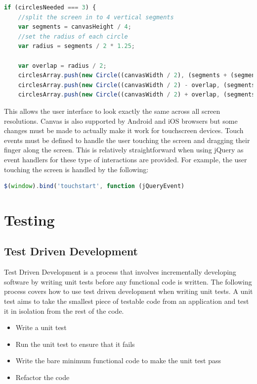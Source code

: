 \documentclass[12pt,a4paper]{report}
\begin{document}
\begin{lstlisting}[language=JavaScript]
if (circlesNeeded === 3) {
    //split the screen in to 4 vertical segments
    var segments = canvasHeight / 4;
    //set the radius of each circle
    var radius = segments / 2 * 1.25;

    var overlap = radius / 2;
    circlesArray.push(new Circle((canvasWidth / 2), (segments + (segments * 2)) / 2 + (segments / 6), radius));
    circlesArray.push(new Circle((canvasWidth / 2) - overlap, (segments * 2 + (segments * 3)) / 2 - (segments / 6), radius));
    circlesArray.push(new Circle((canvasWidth / 2) + overlap, (segments * 2 + (segments * 3)) / 2 - (segments / 6), radius));

\end{lstlisting}

This allows the user interface to look exactly the same across all screen resolutions. Canvas is also supported by Android and iOS browsers but some changes must be made to actually make it work for touchscreen devices. Touch events must be defined to handle the user touching the screen and dragging their finger along the screen. This is relatively straightforward when using jQuery as event handlers for these type of interactions are provided. For example, the user touching the screen is handled by the following:


\begin{lstlisting}[language=JavaScript]
$(window).bind('touchstart', function (jQueryEvent)

\end{lstlisting}





\chapter{Testing}

\section{Test Driven Development}
Test Driven Development is a process that involves incrementally developing software by writing unit tests before any functional code is written. The following process covers how to use test driven development when writing unit tests. A unit test aims to take the smallest piece of testable code from an application and test it in isolation from the rest of the code. 

\begin{itemize}
   \item Write a unit test
   \item Run the unit test to ensure that it fails
   \item Write the bare minimum functional code to make the unit test pass
   \item Refactor the code
\end{itemize}
\end{document}
